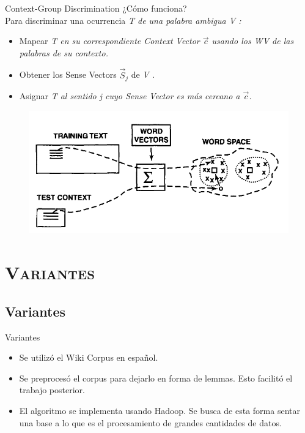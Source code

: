 \documentclass[xcolor=x11names,compress]{beamer}
\renewcommand{\(}{\begin{columns}}
\renewcommand{\)}{\end{columns}}
\newcommand{\<}[1]{\begin{column}{#1}}
\renewcommand{\>}{\end{column}}
\begin{document}
\begin{frame}{Context-Group Discrimination}
¿Cómo funciona?\\
Para discriminar una ocurrencia \em T \em de una palabra ambigua \em V \em:
\begin{itemize}
\item Mapear \em T \em en su correspondiente Context Vector $\vec c$ usando los WV de las palabras de su contexto.
\item Obtener los Sense Vectors $\vec S_j$ de \em V \em.
\item Asignar \em T \em al sentido \em j \em cuyo Sense Vector es más cercano a $\vec c$.
\end{itemize}
\begin{figure}
\centering
\includegraphics[scale=0.4, keepaspectratio=True, natwidth=800,natheight=600]{basig_design.png}
\end{figure}
\end{frame}

\section{\scshape Variantes}
\subsection{Variantes}
\begin{frame}{Variantes}
\begin{itemize}
\item Se utilizó el Wiki Corpus en español.
\item Se preprocesó el corpus para dejarlo en forma de lemmas. Esto facilitó el trabajo posterior.
\item El algoritmo se implementa usando Hadoop. Se busca de esta forma sentar una base a lo que es el procesamiento de grandes cantidades de datos.
\end{itemize}
\end{frame}
\end{document}
